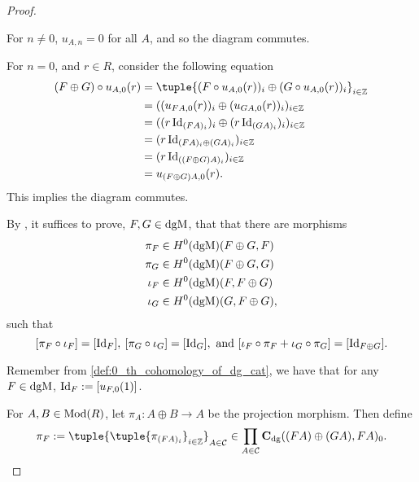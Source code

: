\begin{proof}
\begin{itemize}
{            For \( n \neq 0 \), \( u_{A, n} = 0 \) for all \( A \), and so the diagram commutes.

            For \( n = 0 \), and \( r \in R \), consider the following equation
            \begin{align*}
                (F \oplus G) \circ u_{A, 0} (r) &= \tuple{ (F \circ u_{A, 0} (r))_i \oplus (G \circ u_{A, 0} (r))_i }_{i \in \Zb} \\
                &= ((u_{F A, 0} (r))_i \oplus (u_{G A, 0} (r))_i)_{i \in \Zb} \\
                &= ((r \Id_{(F A)_i})_i \oplus (r \Id_{(G A)_i})_i)_{i \in \Zb} \\
                &= (r \Id_{(F A)_i \oplus (G A)_i})_{i \in \Zb} \\
                &= (r \Id_{((F \oplus G ) A)_i })_{i \in \Zb} \\
                &= u_{(F \oplus G ) A, 0} (r).
            \end{align*}
            This implies the diagram commutes.
        }
    \end{itemize}
    
    By \cite[p. 250]{Mac_Lane_1995}, it suffices to prove, \( F, G \in \operatorname{dgM} \), that that there are morphisms
    \begin{align*}
        \pi_F &\in H^0(\operatorname{dgM})(F \oplus G, F) \\
        \pi_G &\in H^0(\operatorname{dgM})(F \oplus G, G) \\
        \iota_F &\in H^0(\operatorname{dgM})(F, F \oplus G) \\
        \iota_G &\in H^0(\operatorname{dgM})(G, F \oplus G), \\
    \end{align*}
    such that
    \[
        [\pi_F \circ \iota_F] = [\operatorname{Id}_F], \: [\pi_G \circ \iota_G] = [\operatorname{Id}_G], \text{ and } [\iota_F \circ \pi_F + \iota_G \circ \pi_G] = [\operatorname{Id}_{F \oplus G}].
    \]

    Remember from \autoref{def:0_th_cohomology_of_dg_cat}, we have that for any \( F \in \operatorname{dgM} \), \( \operatorname{Id}_F := [u_{F, 0} ( 1 )] \).

    For \( A, B \in \operatorname{Mod}(R) \), let \( \pi_A: A \oplus B \to A \) be the projection morphism. Then define
    \[
        \pi_F := \tuple{ \tuple{ \pi_{(F A)_i} }_{i \in \Zb} }_{A \in \Cc} \in \prod_{A \in \Cc} \C_{\dg}((F A) \oplus (G A), F A)_0.
    \]


\end{proof}
